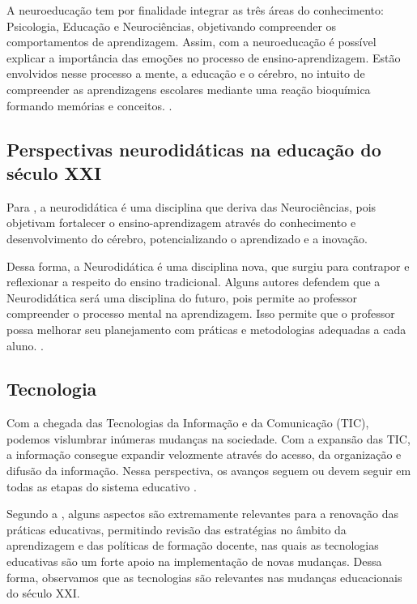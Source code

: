 \documentclass[portuguese]{textolivre}
\begin{document}
A neuroeducação tem por finalidade integrar as três áreas do conhecimento: Psicologia, Educação e Neurociências, objetivando compreender os comportamentos de aprendizagem. Assim, com a neuroeducação é possível explicar a importância das emoções no processo de ensino-aprendizagem. Estão envolvidos nesse processo a mente, a educação e o cérebro, no intuito de compreender as aprendizagens escolares mediante uma reação bioquímica formando memórias e conceitos. \cite{brandao_contribuicoes_2019}.

\subsection{Perspectivas neurodidáticas na educação do século XXI}\label{sec-conduta}
Para \textcite{fernandez_martinez_propuesta_2021}, a neurodidática é uma disciplina que deriva das Neurociências, pois objetivam fortalecer o ensino-aprendizagem através do conhecimento e desenvolvimento do cérebro, potencializando o aprendizado e a inovação.

Dessa forma, a Neurodidática é uma disciplina nova, que surgiu para contrapor e reflexionar a respeito do ensino tradicional. Alguns autores defendem que a Neurodidática será uma disciplina do futuro, pois permite ao professor compreender o processo mental na aprendizagem. Isso permite que o professor possa melhorar seu planejamento com práticas e metodologias adequadas a cada aluno. \cite{fernandez_martinez_propuesta_2021}.

\subsection{Tecnologia}\label{sec-fmt-manuscrito}
Com a chegada das Tecnologias da Informação e da Comunicação (TIC), podemos vislumbrar inúmeras mudanças na sociedade. Com a expansão das TIC, a informação consegue expandir velozmente através do acesso, da organização e difusão da informação. Nessa perspectiva, os avanços seguem ou devem seguir em todas as etapas do sistema educativo \cite[p. 15]{navas-parejo_entornos_2022}.

Segundo a \textcite[p. 06]{unesco_enfoques_2013}, alguns aspectos são extremamente relevantes para a renovação das práticas educativas, permitindo revisão das estratégias no âmbito da aprendizagem e das políticas de formação docente, nas quais as tecnologias educativas são um forte apoio na implementação de novas mudanças. Dessa forma, observamos que as tecnologias são relevantes nas mudanças educacionais do século XXI.
\end{document}
